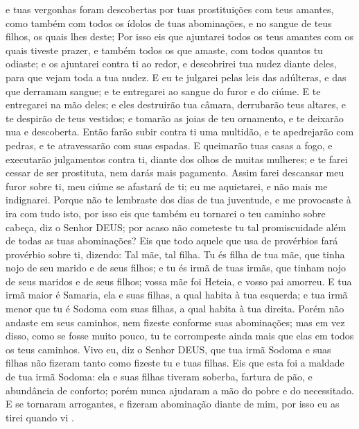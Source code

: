 { e tuas vergonhas foram descobertas por tuas prostituições com teus amantes, como também com todos os ídolos de tuas abominações, e no sangue de teus filhos, os quais lhes deste;
Por isso eis que ajuntarei todos os teus amantes com os quais tiveste prazer, e também todos os que amaste, com todos quantos tu odiaste; e os ajuntarei contra ti ao redor, e descobrirei tua nudez diante deles, para que vejam toda a tua nudez.
E eu te julgarei pelas leis das adúlteras, e das que derramam sangue; e te entregarei ao sangue do furor e do ciúme.
E te entregarei na mão deles; e eles destruirão tua câmara, derrubarão teus altares, e te despirão de teus vestidos; e tomarão as joias de teu ornamento, e te deixarão nua e descoberta.
Então farão subir contra ti uma multidão, e te apedrejarão com pedras, e te atravessarão com suas espadas.
E queimarão tuas casas a fogo, e executarão julgamentos contra ti, diante dos olhos de muitas mulheres; e te farei cessar de ser prostituta, nem darás mais pagamento.
Assim farei descansar meu furor sobre ti, meu ciúme se afastará de ti; eu me aquietarei, e não mais me indignarei.
Porque não te lembraste dos dias de tua juventude, e me provocaste à ira com tudo isto, por isso eis que também eu tornarei o teu caminho sobre
{} cabeça, diz o Senhor DEUS; por acaso não cometeste tu tal promiscuidade além de todas as tuas abominações?
Eis que todo aquele que usa de provérbios fará provérbio sobre ti, dizendo: Tal mãe, tal filha.
Tu és filha de tua mãe, que tinha nojo de seu marido e de seus filhos; e tu és irmã de tuas irmãs, que tinham nojo de seus maridos e de seus filhos; vossa mãe foi Heteia, e vosso pai amorreu.
E tua irmã maior é Samaria, ela e suas filhas, a qual habita à tua esquerda; e tua irmã menor que tu é Sodoma com suas filhas, a qual habita à tua direita.
Porém não andaste em seus caminhos, nem fizeste conforme suas abominações; mas em vez disso, como se fosse muito pouco, tu te corrompeste ainda mais que elas em todos os teus caminhos.
Vivo eu, diz o Senhor DEUS, que tua irmã Sodoma e suas filhas não fizeram tanto como fizeste tu e tuas filhas.
Eis que esta foi a maldade de tua irmã Sodoma: ela e suas filhas tiveram soberba, fartura de pão, e abundância de conforto; porém nunca ajudaram a mão do pobre e do necessitado.
E se tornaram arrogantes, e fizeram abominação diante de mim, por isso eu as tirei quando vi
{} .
}
